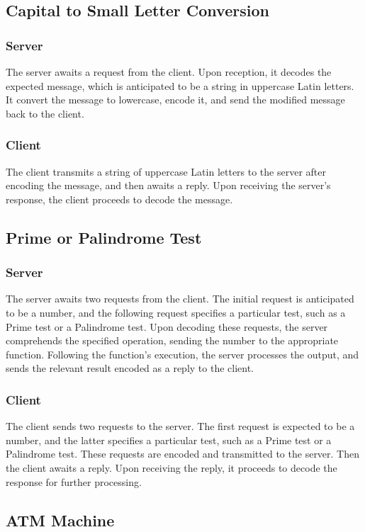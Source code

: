 \documentclass[11pt]{article}
\begin{document}
    \subsection{Capital to Small Letter Conversion}
        \subsubsection{Server}
        The server awaits a request from the client. Upon reception, it decodes the expected message, which is anticipated to be a string in uppercase Latin letters. It convert the message to lowercase, encode it, and send the modified message back to the client.
        \subsubsection{Client}
        The client transmits a string of uppercase Latin letters to the server after encoding the message, and then awaits a reply. Upon receiving the server's response, the client proceeds to decode the message.
    \subsection{Prime or Palindrome Test}
        \subsubsection{Server}
        The server awaits two requests from the client. The initial request is anticipated to be a number, and the following request specifies a particular test, such as a Prime test or a Palindrome test. Upon decoding these requests, the server comprehends the specified operation, sending the number to the appropriate function. Following the function's execution, the server processes the output, and sends the relevant result encoded as a reply to the client.
        \subsubsection{Client}
        The client sends two requests to the server. The first request is expected to be a number, and the latter specifies a particular test, such as a Prime test or a Palindrome test. These requests are encoded and transmitted to the server. Then the client awaits a reply. Upon receiving the reply, it proceeds to decode the response for further processing.
    \subsection{ATM Machine}
\end{document}
